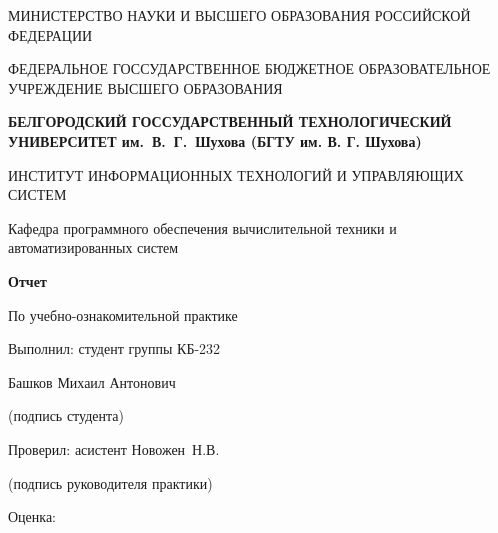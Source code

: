 \documentclass[12pt, a4paper]{article}
\begin{document}
	
	\begin{center}
	 	{\large МИНИСТЕРСТВО НАУКИ И ВЫСШЕГО ОБРАЗОВАНИЯ РОССИЙСКОЙ ФЕДЕРАЦИИ} 

		{\large ФЕДЕРАЛЬНОЕ ГОССУДАРСТВЕННОЕ БЮДЖЕТНОЕ ОБРАЗОВАТЕЛЬНОЕ УЧРЕЖДЕНИЕ ВЫСШЕГО ОБРАЗОВАНИЯ}
		\begin{center}
			{\large \textbf{БЕЛГОРОДСКИЙ ГОССУДАРСТВЕННЫЙ ТЕХНОЛОГИЧЕСКИЙ УНИВЕРСИТЕТ \mbox{им. В. Г. Шухова} (БГТУ им. В. Г. Шухова)}}
		\end{center}	
	\end{center}
	
	\begin{center}
		{\large ИНСТИТУТ ИНФОРМАЦИОННЫХ ТЕХНОЛОГИЙ И УПРАВЛЯЮЩИХ СИСТЕМ}
	\end{center}
	\begin{center}
		{\large Кафедра программного обеспечения вычислительной техники и автоматизированных систем}
	\end{center}
	\begin{center}
		\vspace{1cm}
		{\textbf {\Large Отчет}}

		{\Large По учебно-ознакомительной практике}
	
	\end{center}

	\begin{flushright}
		\vspace{1cm}
		{\large Выполнил: студент группы КБ-232}

		{\large Башков Михаил Антонович}

		\vspace{0.5cm}

		{(подпись студента)}

		\vspace{0.5cm}
		{\large Проверил: асистент \mbox{Новожен Н.В.}}
		\vspace{0.5cm}


		{(подпись руководителя практики)}

		\vspace{0.3cm}
		{\large Оценка:}

	\end{flushright}
	
\end{document}
